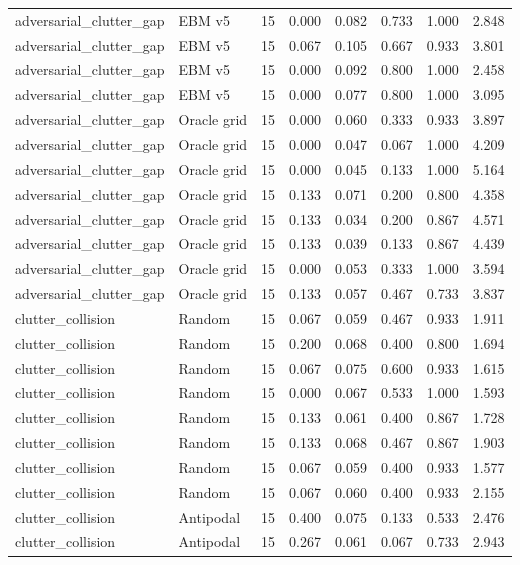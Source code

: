 {\begin{longtable}{llrrrrrr}
adversarial\_clutter\_gap & EBM v5 & 15 & 0.000 & 0.082 & 0.733 & 1.000 & 2.848 \\
adversarial\_clutter\_gap & EBM v5 & 15 & 0.067 & 0.105 & 0.667 & 0.933 & 3.801 \\
adversarial\_clutter\_gap & EBM v5 & 15 & 0.000 & 0.092 & 0.800 & 1.000 & 2.458 \\
adversarial\_clutter\_gap & EBM v5 & 15 & 0.000 & 0.077 & 0.800 & 1.000 & 3.095 \\
adversarial\_clutter\_gap & Oracle grid & 15 & 0.000 & 0.060 & 0.333 & 0.933 & 3.897 \\
adversarial\_clutter\_gap & Oracle grid & 15 & 0.000 & 0.047 & 0.067 & 1.000 & 4.209 \\
adversarial\_clutter\_gap & Oracle grid & 15 & 0.000 & 0.045 & 0.133 & 1.000 & 5.164 \\
adversarial\_clutter\_gap & Oracle grid & 15 & 0.133 & 0.071 & 0.200 & 0.800 & 4.358 \\
adversarial\_clutter\_gap & Oracle grid & 15 & 0.133 & 0.034 & 0.200 & 0.867 & 4.571 \\
adversarial\_clutter\_gap & Oracle grid & 15 & 0.133 & 0.039 & 0.133 & 0.867 & 4.439 \\
adversarial\_clutter\_gap & Oracle grid & 15 & 0.000 & 0.053 & 0.333 & 1.000 & 3.594 \\
adversarial\_clutter\_gap & Oracle grid & 15 & 0.133 & 0.057 & 0.467 & 0.733 & 3.837 \\
clutter\_collision & Random & 15 & 0.067 & 0.059 & 0.467 & 0.933 & 1.911 \\
clutter\_collision & Random & 15 & 0.200 & 0.068 & 0.400 & 0.800 & 1.694 \\
clutter\_collision & Random & 15 & 0.067 & 0.075 & 0.600 & 0.933 & 1.615 \\
clutter\_collision & Random & 15 & 0.000 & 0.067 & 0.533 & 1.000 & 1.593 \\
clutter\_collision & Random & 15 & 0.133 & 0.061 & 0.400 & 0.867 & 1.728 \\
clutter\_collision & Random & 15 & 0.133 & 0.068 & 0.467 & 0.867 & 1.903 \\
clutter\_collision & Random & 15 & 0.067 & 0.059 & 0.400 & 0.933 & 1.577 \\
clutter\_collision & Random & 15 & 0.067 & 0.060 & 0.400 & 0.933 & 2.155 \\
clutter\_collision & Antipodal & 15 & 0.400 & 0.075 & 0.133 & 0.533 & 2.476 \\
clutter\_collision & Antipodal & 15 & 0.267 & 0.061 & 0.067 & 0.733 & 2.943 \\

\end{longtable}}
